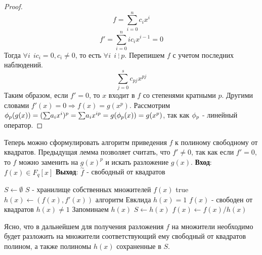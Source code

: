 \begin{proof}
  \[ f = \overset{n}{\underset{i=0}{\sum}} c_{i}x^{i} \]
  \[ f' = \overset{n}{\underset{i=0}{\sum}} ic_{i}x^{i - 1} = 0 \]
  Тогда $ \forall i ~~ ic_i = 0, c_i \ne 0 $, то есть $ \forall i ~~ i ~ \vdots ~ p $. 
  Перепишем $ f $ с учетом последних наблюдений.
  \[ \overset{s}{\underset{j = 0}{\sum}} c_{pj}x^{pj} \]
  Таким образом, если $ f' = 0 $, то $ x $ входит в $ f $ со степенями кратными $ p $. Другими словами
  $ f'(x) = 0 \Rightarrow f(x) = g(x^p) $. 
  Рассмотрим $ \phi_{p}(g(x)) = ({\sum}a_ix^i)^p = {\sum}a_ix^{ip} = g(\phi_{p}(x)) = g(x^p) $, так как $ \phi_{p} $ -
  линейный оператор. 
\end{proof}

Теперь можно сформулировать алгоритм приведения $ f $ к полиному свободному от квадратов. Предыдущая лемма
позволяет считать, что $ f' \ne 0 $, так как если $ f' = 0 $, то $ f $ можно заменить на $ g(x)^p $ и искать
разложение $ g(x) $. \newline  \newline
{\bf{Вход}}: $ f(x) \in F_q[x] $ {\bf{Выход}}: $ \overset{\sim}{f} $ - свободный от квадратов \newline

\begin{codebox}
    \li $ S \gets \emptyset $ \Comment $ S $ - хранилище собственных множителей $ f(x) $
    \li \While true
      \li \Do $ h(x) \gets (f(x), f'(x)) $ \Comment алгоритм Евклида
      \li \If $ h(x) = 1 $ 
        \li \Do \Return \Comment $ f(x) $ - свободен от квадратов
	\li \End
      \li \If $ h(x) \ne 1 $
       \li \Comment Запоминаем $ h(x) $
        \li \Do $ S \gets h(x) $ 
	  \li $ f(x) \gets f(x) / h(x) $
\end{codebox}

Ясно, что в дальнейшем для получения разложения $ f $ на множители необходимо будет разложить на множители
соответствующий ему свободный от квадратов полином, а также полиномы $ h(x) $ сохраненные в $ S $.



